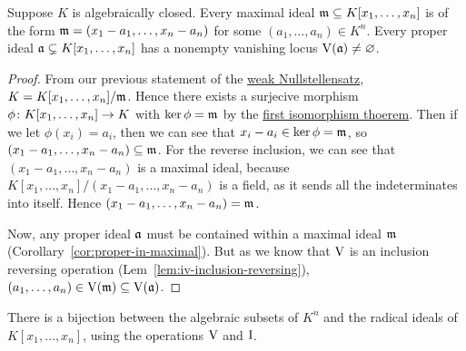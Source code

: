 \begin{lemma}\label{lem:weak-nullstellensatz}
    Suppose \(K\) is algebraically closed.
    Every maximal ideal \(\mathfrak{m} \subseteq K[x_1,\hdots,x_n]\) is of the form
    \(\mathfrak{m} = (x_1-a_1,\hdots,x_n-a_n)\) for some \((a_1,\hdots,a_n) \in K^n\).
    Every proper ideal \(\mathfrak{a} \subsetneq K[x_1,\hdots,x_n]\)
    has a nonempty vanishing locus \(\operatorname{V}(\mathfrak{a}) \neq \varnothing\).
\end{lemma}
\begin{proof}
    From our previous statement of the \hyperref[cor:weak-nullstellensatz]{weak Nullstellensatz},
    \(K = K[x_1,\hdots,x_n]/\mathfrak{m}\).
    Hence there exists a surjecive morphism \(\phi\colon K[x_1,\hdots,x_n]\to K\)
    with \(\ker\phi = \mathfrak{m}\) by the \hyperref[thm:iso-1-ring]{first isomorphism thoerem}.
    Then if we let \(\phi(x_i) = a_i\),
    then we can see that \(x_i-a_i \in \ker\phi = \mathfrak{m}\),
    so \((x_1-a_1,\hdots,x_n-a_n) \subseteq \mathfrak{m}\).
    For the reverse inclusion, we can see that \((x_1-a_1,\hdots,x_n-a_n)\) is a maximal ideal,
    because \(K[x_1,\hdots,x_n]/(x_1-a_1,\hdots,x_n-a_n)\) is a field,
    as it sends all the indeterminates into itself.
    Hence \((x_1-a_1,\hdots,x_n-a_n) = \mathfrak{m}\).

    Now, any proper ideal \(\mathfrak{a}\) must be contained within a maximal ideal \(\mathfrak{m}\)
    (Corollary~\ref{cor:proper-in-maximal}).
    But as we know that \(\operatorname{V}\) is an inclusion reversing operation
    (Lem~\ref{lem:iv-inclusion-reversing}),
    \((a_1,\hdots,a_n) \in \operatorname{V}(\mathfrak{m}) \subseteq \operatorname{V}(\mathfrak{a})\).
\end{proof}
\begin{theorem}\label{thm:nullstellensatz}
    There is a bijection between the algebraic subsets of \(K^n\)
    and the radical ideals of \(K[x_1,\hdots,x_n]\),
    using the operations \(\operatorname{V}\) and \(\operatorname{I}\).
\end{theorem}
